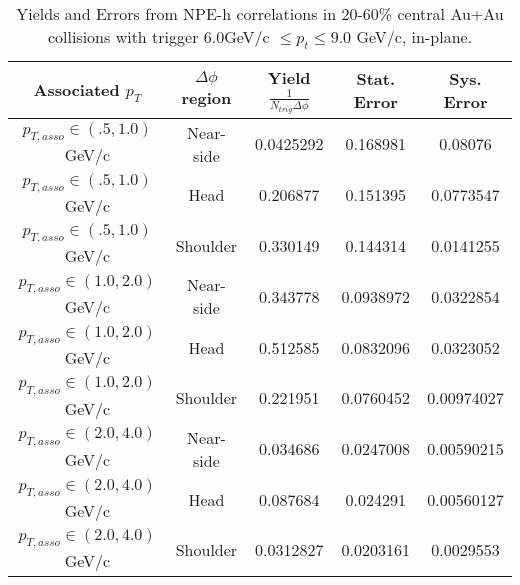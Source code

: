 \begin{table}
\centering
\begin{tabular}{|c|c|c|c|c|}
\hline
Associated $p_T$    & $\Delta\phi$ region & Yield $\frac{1}{N_{trig} \Delta\phi}$ & Stat. Error & Sys. Error\\
\hline
$p_{T,asso} \in(.5, 1.0)$ GeV/c  & Near-side & 0.0425292 & 0.168981 & 0.08076 \\
\hline
$p_{T,asso} \in(.5, 1.0)$ GeV/c  & Head & 0.206877 & 0.151395 & 0.0773547 \\
\hline
$p_{T,asso} \in(.5, 1.0)$ GeV/c  & Shoulder & 0.330149 & 0.144314 & 0.0141255 \\
\hline
$p_{T,asso} \in(1.0, 2.0)$ GeV/c  & Near-side & 0.343778 & 0.0938972 & 0.0322854 \\
\hline
$p_{T,asso} \in(1.0, 2.0)$ GeV/c  & Head & 0.512585 & 0.0832096 & 0.0323052 \\
\hline
$p_{T,asso} \in(1.0, 2.0)$ GeV/c  & Shoulder & 0.221951 & 0.0760452 & 0.00974027 \\
\hline
$p_{T,asso} \in(2.0, 4.0)$ GeV/c  & Near-side & 0.034686 & 0.0247008 & 0.00590215 \\
\hline
$p_{T,asso} \in(2.0, 4.0)$ GeV/c  & Head & 0.087684 & 0.024291 & 0.00560127 \\
\hline
$p_{T,asso} \in(2.0, 4.0)$ GeV/c  & Shoulder & 0.0312827 & 0.0203161 & 0.0029553 \\
\hline
\end{tabular}
\caption[Yields and Errors in Au+Au Correlations, In-Plane, 20-60\%, High Trigger]{Yields and Errors from NPE-h correlations in 20-60\% central Au+Au collisions with trigger $6.0 $GeV/c $\leq p_t \leq 9.0$ GeV/c, in-plane.}
\label{tab:InPlaneLow}
\end{table}

